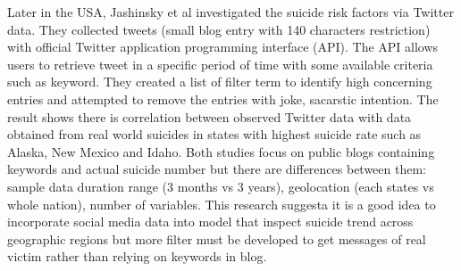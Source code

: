 Later in the USA, Jashinsky et al \cite{Jashinsky2014}  investigated the suicide risk factors via Twitter data. They collected tweets (small blog entry with 140 characters restriction) with official Twitter application programming interface (API). The API allows users to retrieve tweet in a specific period of time with some available criteria such as keyword. They created a list of filter term to identify high concerning entries and attempted to remove the entries with joke, sacarstic intention. The result shows there is correlation between observed Twitter data with data obtained from real world suicides in states with highest suicide rate such as Alaska, New Mexico and Idaho. Both studies focus on public blogs containing keywords and actual suicide number but there are differences between them: sample data duration range (3 months vs 3 years), geolocation (each states vs whole nation), number of variables. This research suggesta it is a good idea to incorporate social media data into model that inspect suicide trend across geographic regions but more filter must be developed to get messages of real victim rather than relying on keywords in blog.\\

